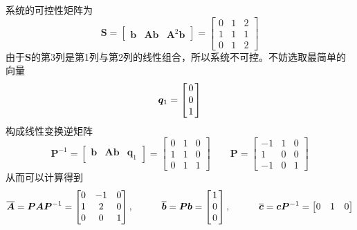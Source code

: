 \solve 系统的可控性矩阵为
\begin{equation*}
	\bm{S} = 
	\begin{bmatrix}
		\bm{b} & \bm{Ab} & \bm{A}^2\bm{b}
	\end{bmatrix}
	= 
	\begin{bmatrix}
		0 & 1 & 2\\
		1 & 1 & 1\\
		0 & 1 & 2
	\end{bmatrix}
\end{equation*}
由于$\bm{S}$的第3列是第1列与第2列的线性组合，所以系统不可控。不妨选取最简单的向量
\begin{equation*}
	\bm{q}_1 =
	\begin{bmatrix}
		\hspace*{0.5mm}0\hspace*{0.5mm}\\
		0\\
		1
	\end{bmatrix}
\end{equation*}
构成线性变换逆矩阵
\begin{equation*}
	\bm{P}^{-1} = 
	\begin{bmatrix}
			\bm{b} & \bm{Ab} & \bm{q}_1
	\end{bmatrix}
	=
	\begin{bmatrix}
		0 & 1 & 0\\
		1 & 1 & 0\\
		0 & 1 & 1
	\end{bmatrix}
	\qquad 
	\bm{P} = 
	\begin{bmatrix}
		-1 & 1 & 0\\
		1& 0 &0\\
		-1 & 0 & 1
	\end{bmatrix}
\end{equation*}
从而可以计算得到
\begin{equation*}
	\overline{\bm{A}} = \bm{PAP}^{-1} =
	\begin{bmatrix}
		0 & -1 & 0\\
		1 & 2 & 0\\
		0 & 0 &1
	\end{bmatrix}
	, \qquad \quad 
	\overline{\bm{b}} = \bm{Pb} = 
	\begin{bmatrix}
		\hspace*{0.5mm} 1 \hspace*{0.5mm}\\
		0 \\
		0 \\
	\end{bmatrix}
	, \qquad\quad 
	\overline{\bm{c}} = \bm{cP}^{-1} = 
	\begin{bmatrix}
		0 & 1 & 0
	\end{bmatrix}
\end{equation*}

